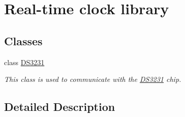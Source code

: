 \hypertarget{group__real-time__clock}{}\section{Real-\/time clock library}
\label{group__real-time__clock}
\subsection*{Classes}
\begin{DoxyCompactItemize}
\item 
class \mbox{\hyperlink{class_d_s3231}{D\+S3231}}
\begin{DoxyCompactList}\small\item\em This class is used to communicate with the \mbox{\hyperlink{class_d_s3231}{D\+S3231}} chip. \end{DoxyCompactList}\end{DoxyCompactItemize}


\subsection{Detailed Description}

